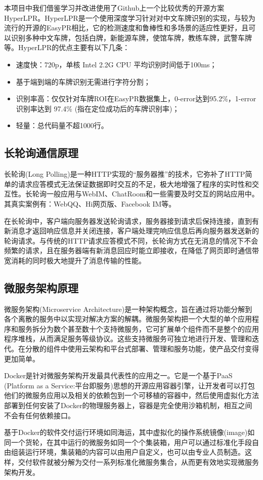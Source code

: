本项目中我们借鉴学习并改进使用了Github上一个比较优秀的开源方案HyperLPR。HyperLPR是一个使用深度学习针对对中文车牌识别的实现，与较为流行的开源的EasyPR相比，它的检测速度和鲁棒性和多场景的适应性更好，且可以识别多种中文车牌，包括白牌，新能源车牌，使馆车牌，教练车牌，武警车牌等。HyperLPR的优点主要有以下几条：
\begin{itemize}
	\item 速度快：720p，单核 Intel 2.2G CPU 平均识别时间低于100ms；
	\item 基于端到端的车牌识别无需进行字符分割；
	\item 识别率高：仅仅针对车牌ROI在EasyPR数据集上，0-error达到95.2\%，1-error识别率达到 97.4\% (指在定位成功后的车牌识别率)；
	\item 轻量：总代码量不超1000行。
\end{itemize}

\subsection{长轮询通信原理}
长轮询(Long Polling)是一种HTTP实现的“服务器推”的技术，它弥补了HTTP简单的请求应答模式无法保证数据即时交互的不足，极大地增强了程序的实时性和交互性。长轮询一般应用与WebIM、ChatRoom和一些需要及时交互的网站应用中。其真实案例有：WebQQ、Hi网页版、Facebook IM等。

在长轮询中，客户端向服务器发送轮询请求，服务器接到请求后保持连接，直到有新消息才返回响应信息并关闭连接，客户端处理完响应信息后再向服务器发送新的轮询请求。与传统的HTTP请求应答模式不同，长轮询方式在无消息的情况下不会频繁的请求，且在服务器端有新消息回应时能立即接收，在降低了网页即时通信带宽消耗的同时极大地提升了消息传输的性能。

\subsection{微服务架构原理}
微服务架构(Microservice Architecture)是一种架构概念，旨在通过将功能分解到各个离散的服务中以实现对解决方案的解耦。微服务架构把一个大型的单个应用程序和服务拆分为数个甚至数十个支持微服务，它可扩展单个组件而不是整个的应用程序堆栈，从而满足服务等级协议。这些支持微服务可独立地进行开发、管理和迭代。在分散的组件中使用云架构和平台式部署、管理和服务功能，使产品交付变得更加简单。

Docker是针对微服务架构开发最具代表性的应用之一。它是一个基于PaaS (Platform as a Service:平台即服务)思想的开源应用容器引擎，让开发者可以打包他们的微服务应用以及相关的依赖包到一个可移植的容器中，然后使用虚拟化方法部署到任何安装了Docker的物理服务器上，容器是完全使用沙箱机制，相互之间不会有任何依赖接口。

基于Docker的软件交付运行环境如同海运，其中虚拟化的操作系统镜像(image)如同一个货轮，在其中运行的微服务如同一个个集装箱，用户可以通过标准化手段自由组装运行环境，集装箱的内容可以由用户自定义，也可以由专业人员制造。这样，交付软件就被分解为交付一系列标准化微服务集合，从而更有效地实现微服务架构开发。
